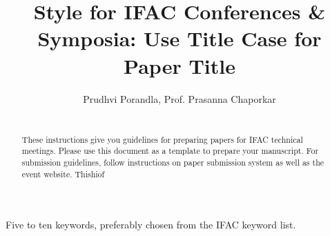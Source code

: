 \documentclass{absconf}
\begin{document}
\begin{frontmatter}

\title{Style for IFAC Conferences \& Symposia: Use Title Case for
Paper Title}

\author{Prudhvi Porandla, Prof. Prasanna Chaporkar} 
\address{ Electrical Engineering, IIT Bombay   }
	\vspace{12pt}
\begin{abstract}                %
	\mbox{} \\ 
	These instructions give you guidelines for preparing papers for IFAC
technical meetings. Please use this document as a template to prepare
your manuscript. For submission guidelines, follow instructions on
paper submission system as well as the event website.
Thishiof
\end{abstract}

\begin{keyword}
Five to ten keywords, preferably chosen from the IFAC keyword list.
\end{keyword}

\end{frontmatter}
\end{document}
